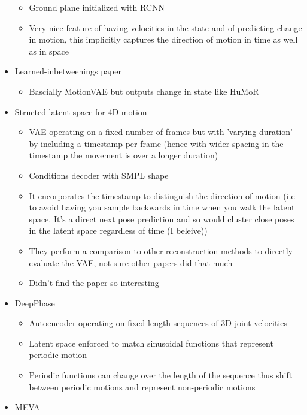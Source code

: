\begin{itemize}
\begin{itemize}
        \item Ground plane initialized with RCNN
        \item Very nice feature of having velocities in the state and of predicting change in motion, this implicitly captures the direction of motion in time as well as in space 
    \end{itemize}
    \item Learned-inbetweenings paper \cite{learnedInbetweening}
    \begin{itemize}
        \item Bascially MotionVAE but outputs change in state like HuMoR
    \end{itemize}
    \item Structed latent space for 4D motion \cite{structured4Dlatentspace}
    \begin{itemize}
        \item VAE operating on a fixed number of frames but with 'varying duration' by including a timestamp per frame (hence with wider spacing in the timestamp the movement is over a longer duration)
        \item Conditions decoder with SMPL shape
        \item It encorporates the timestamp to distinguish the direction of motion (i.e to avoid having you sample backwards in time when you walk the latent space. It's a direct next pose prediction and so would cluster close poses in the latent space regardless of time (I beleive))
        \item They perform a comparison to other reconstruction methods to directly evaluate the VAE, not sure other papers did that much
        \item Didn't find the paper so interesting
    \end{itemize}
    \item DeepPhase \cite{DeepPhase}
    \begin{itemize}
        \item Autoencoder operating on fixed length sequences of 3D joint velocities
        \item Latent space enforced to match sinusoidal functions that represent periodic motion
        \item Periodic functions can change over the length of the sequence thus shift between periodic motions and represent non-periodic motions
    \end{itemize}
    \item MEVA \cite{MEVA}
    \begin{itemize}

\end{itemize}
\end{itemize}
